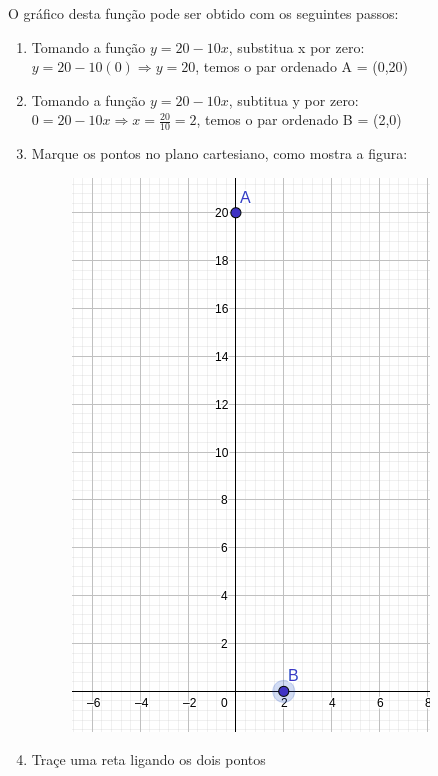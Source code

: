 \begin{multicols*}{2}
    O gráfico desta função pode ser obtido com os seguintes passos:
    \begin{enumerate}
        \item Tomando a função $ y = 20 -10x$, substitua x por zero: $y = 20 - 10(0) \Rightarrow
                  y = 20$, temos o par ordenado A = (0,20)
        \item Tomando a função $ y = 20 -10x$, subtitua y por zero: $0 = 20 - 10x \Rightarrow
                  x = \frac{20}{10} = 2$, temos o par ordenado B = (2,0)
        \item Marque os pontos no plano cartesiano, como mostra a figura:
              \begin{figure}[H]
                  \centering
                  \includegraphics[scale=0.3]{assets/rafael/img12.png}
              \end{figure}
        \item Traçe uma reta ligando os dois pontos
              \begin{figure}[H]
                  \centering

\end{figure}
\end{enumerate}
\end{multicols*}
